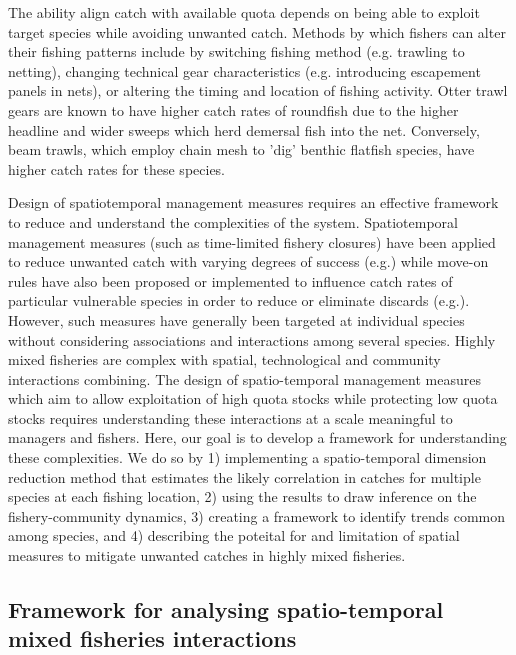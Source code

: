 \documentclass{nature}
\begin{document}
\begin{linenumbers}
The ability align catch with available
quota depends on being able to exploit target species while avoiding unwanted
catch. Methods by which fishers can alter their fishing patterns include by
switching fishing method (e.g.  trawling to netting), changing technical gear
characteristics (e.g.  introducing escapement panels in nets), or altering the
timing and location of fishing activity\cite{Fulton2011b, vanPutten2012a}.
Otter trawl gears are known to have higher catch rates of roundfish due to the
higher headline and wider sweeps which herd demersal fish into the net.
Conversely, beam trawls, which employ chain mesh to 'dig' benthic flatfish
species, have higher catch rates for these species\cite{Fraser2008}.

Design of spatiotemporal management measures requires an effective framework to
reduce and understand the complexities of the system. Spatiotemporal management
measures (such as time-limited fishery closures) have been applied to reduce
unwanted catch with varying degrees of success (e.g.\cite{Needle2011,
	Holmes2011, Beare2010, Dinmore2003}) while move-on rules have also been
proposed or implemented to influence catch rates of particular vulnerable
species in order to reduce or eliminate discards (e.g.\cite{Gardner2008,
	Dunn2011, Dunn2014a}). However, such measures have generally been
targeted at individual species without considering associations and
interactions among several species. Highly mixed fisheries are complex with
spatial, technological and community interactions combining. The design of
spatio-temporal management measures which aim to allow exploitation of high
quota stocks while protecting low quota stocks requires understanding these
interactions at a scale meaningful to managers and fishers. Here, our goal is
to develop a framework for understanding these complexities. We do so by
1) implementing a spatio-temporal dimension reduction method that estimates the
likely correlation in catches for multiple species at each fishing location, 2)
using the results to draw inference on the fishery-community dynamics, 3)
creating a framework to identify trends common among species, and 4)
describing the poteital for and limitation of spatial measures to mitigate
unwanted catches in highly mixed fisheries.

\subsection{Framework for analysing spatio-temporal mixed fisheries
	interactions}


\end{linenumbers}
\end{document}
